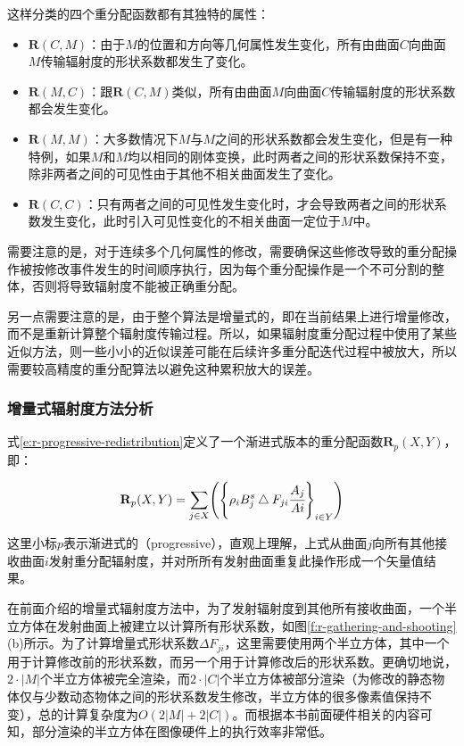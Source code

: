 \noindent 这样分类的四个重分配函数都有其独特的属性：

\begin{itemize}
	\item $\mathbf{R}(C,M)$：由于$M$的位置和方向等几何属性发生变化，所有由曲面$C$向曲面$M$传输辐射度的形状系数都发生了变化。
	\item $\mathbf{R}(M,C)$：跟$\mathbf{R}(C,M)$类似，所有由曲面$M$向曲面$C$传输辐射度的形状系数都会发生变化。 
	\item $\mathbf{R}(M,M)$：大多数情况下$M$与$M$之间的形状系数都会发生变化，但是有一种特例，如果$M$和$M$均以相同的刚体变换，此时两者之间的形状系数保持不变，除非两者之间的可见性由于其他不相关曲面发生了变化。
	\item $\mathbf{R}(C,C)$：只有两者之间的可见性发生变化时，才会导致两者之间的形状系数发生变化，此时引入可见性变化的不相关曲面一定位于$M$中。
\end{itemize}

需要注意的是，对于连续多个几何属性的修改，需要确保这些修改导致的重分配操作被按修改事件发生的时间顺序执行，因为每个重分配操作是一个不可分割的整体，否则将导致辐射度不能被正确重分配。

另一点需要注意的是，由于整个算法是增量式的，即在当前结果上进行增量修改，而不是重新计算整个辐射度传输过程。所以，如果辐射度重分配过程中使用了某些近似方法，则一些小小的近似误差可能在后续许多重分配迭代过程中被放大，所以需要较高精度的重分配算法以避免这种累积放大的误差。




\subsubsection{增量式辐射度方法分析}
式\ref{e:r-progressive-redistribution}定义了一个渐进式版本的重分配函数$\mathbf{R}_p(X,Y)$，即：

\begin{equation}\label{e:r-progressive-redistribution}
	\mathbf{R}_p(X,Y)=\sum_{j\in X}\Biggr(\Biggr\{ \rho_i B^{s}_j \bigtriangleup F_{ji} \cfrac{A_j}{Ai} \Biggr\}_{i\in Y}\Biggr)
\end{equation}

\noindent 这里小标$p$表示渐进式的（progressive），直观上理解，上式从曲面$j$向所有其他接收曲面$i$发射重分配辐射度，并对所所有发射曲面重复此操作形成一个矢量值结果。

在前面介绍的增量式辐射度方法中，为了发射辐射度到其他所有接收曲面，一个半立方体在发射曲面上被建立以计算所有形状系数，如图\ref{f:r-gathering-and-shooting}(b)所示。为了计算增量式形状系数$\Delta F_{ji}$，这里需要使用两个半立方体，其中一个用于计算修改前的形状系数，而另一个用于计算修改后的形状系数。更确切地说，$2\cdot|M|$个半立方体被完全渲染，而$2\cdot |C|$个半立方体被部分渲染（为修改的静态物体仅与少数动态物体之间的形状系数发生修改，半立方体的很多像素值保持不变），总的计算复杂度为$O(2|M|+2|C|)$。而根据本书前面硬件相关的内容可知，部分渲染的半立方体在图像硬件上的执行效率非常低。

